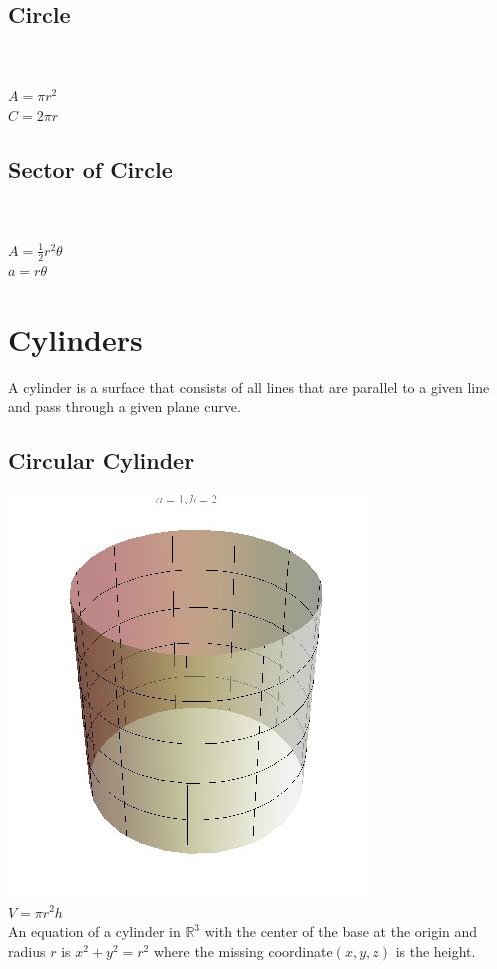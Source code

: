 \documentclass[10pt]{report}
\begin{document}
\subsection{Circle}
\\\\
$A=\pi r^2$\\
$C=2\pi r$

\subsection{Sector of Circle}
\\\\
$A=\frac{1}{2}r^2\theta$\\
$a=r\theta$

\section{Cylinders}
A cylinder is a surface that consists of all lines that are parallel to a given line and pass through a given plane curve.

\subsection{Circular Cylinder}
\includegraphics[scale=.5]{Circular_Cylinder}\\
$V=\pi r^2h$\\
An equation of a cylinder in $\mathbb{R}^3$ with the center of the base at the origin and radius $r$ is $x^2+y^2=r^2$ where the missing coordinate$(x,y,z)$ is the height.
\end{document}
